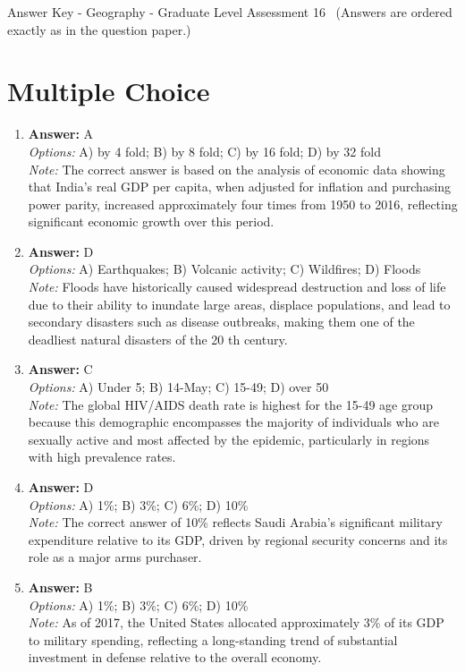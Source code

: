 \documentclass[12pt]{article}
\begin{document}
\begin{center}
Answer Key - Geography - Graduate Level Assessment 16 \
\small (Answers are ordered exactly as in the question paper.)
\end{center}

\section*{Multiple Choice}
\begin{enumerate}[label=\arabic*.]
\item \textbf{Answer:} A
\\ \textit{Options:} A) by 4 fold; B) by 8 fold; C) by 16 fold; D) by 32 fold
\\ \textit{Note:} The correct answer is based on the analysis of economic data showing that India's real GDP per capita, when adjusted for inflation and purchasing power parity, increased approximately four times from 1950 to 2016, reflecting significant economic growth over this period.
\item \textbf{Answer:} D
\\ \textit{Options:} A) Earthquakes; B) Volcanic activity; C) Wildfires; D) Floods
\\ \textit{Note:} Floods have historically caused widespread destruction and loss of life due to their ability to inundate large areas, displace populations, and lead to secondary disasters such as disease outbreaks, making them one of the deadliest natural disasters of the 20 th century.
\item \textbf{Answer:} C
\\ \textit{Options:} A) Under 5; B) 14-May; C) 15-49; D) over 50
\\ \textit{Note:} The global HIV/AIDS death rate is highest for the 15-49 age group because this demographic encompasses the majority of individuals who are sexually active and most affected by the epidemic, particularly in regions with high prevalence rates.
\item \textbf{Answer:} D
\\ \textit{Options:} A) 1\%; B) 3\%; C) 6\%; D) 10\%
\\ \textit{Note:} The correct answer of 10\% reflects Saudi Arabia's significant military expenditure relative to its GDP, driven by regional security concerns and its role as a major arms purchaser.
\item \textbf{Answer:} B
\\ \textit{Options:} A) 1\%; B) 3\%; C) 6\%; D) 10\%
\\ \textit{Note:} As of 2017, the United States allocated approximately 3\% of its GDP to military spending, reflecting a long-standing trend of substantial investment in defense relative to the overall economy.
\end{enumerate}
\end{document}
